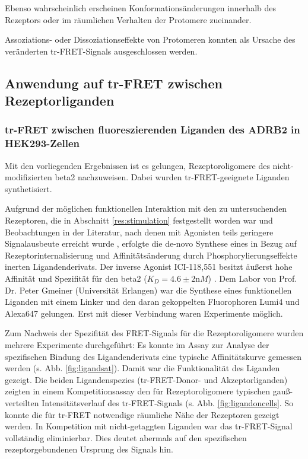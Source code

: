Ebenso wahrscheinlich erscheinen Konformationsänderungen innerhalb des Rezeptors oder im räumlichen Verhalten der Protomere zueinander. 

Assoziations- oder Dissoziationseffekte von Protomeren konnten als Ursache des veränderten tr-FRET-Signals ausgeschlossen werden. 

\subsection{Anwendung auf tr-FRET zwischen Rezeptorliganden}


\subsubsection{tr-FRET zwischen fluoreszierenden Liganden des ADRB2 in HEK293-Zellen}

Mit den vorliegenden Ergebnissen ist es gelungen, Rezeptoroligomere des nicht-modifizierten \gls{beta2} nachzuweisen. Dabei wurden tr-FRET-geeignete Liganden synthetisiert. 

Aufgrund der möglichen funktionellen Interaktion mit den zu untersuchenden Rezeptoren, die in Abschnitt \ref{res:stimulation} festgestellt worden war und Beobachtungen in der Literatur, nach denen mit Agonisten teils geringere Signalausbeute erreicht wurde \parencite{Albizu2010, Emami-Nemini2013}, erfolgte die de-novo Synthese eines in Bezug auf Rezeptorinternalisierung und Affinitätsänderung durch Phosphorylierungseffekte inerten Ligandenderivats. Der inverse Agonist ICI-118,551 besitzt äußerst hohe Affinität und Spezifität für den \gls{beta2} ($K_D=4.6 \pm 2\si{\nano M}$) \parencite{Mauriege1988}. Dem Labor von Prof. Dr. Peter Gmeiner (Universität Erlangen) war die Synthese eines funktionellen Liganden mit einem Linker und den daran gekoppelten Fluorophoren Lumi4 und Alexa647 gelungen. Erst mit dieser Verbindung waren Experimente möglich.

Zum Nachweis der Spezifität des FRET-Signals für die Rezeptoroligomere wurden mehrere Experimente durchgeführt: Es konnte im Assay zur Analyse der spezifischen Bindung des Ligandenderivats eine typische Affinitätskurve gemessen werden (s. Abb. \ref{fig:ligandsat}). Damit war die Funktionalität des Liganden gezeigt. Die beiden Ligandenspezies (tr-FRET-Donor- und Akzeptorliganden) zeigten in einem Kompetitionsassay den für Rezeptoroligomere typischen gauß-verteilten Intensitätsverlauf des tr-FRET-Signals (s. Abb. \ref{fig:ligandoncells}. So konnte die für tr-FRET notwendige räumliche Nähe der Rezeptoren gezeigt werden. In Kompetition mit nicht-getaggten Liganden war das tr-FRET-Signal vollständig eliminierbar. Dies deutet abermals auf den spezifischen rezeptorgebundenen Ursprung des Signals hin. 

